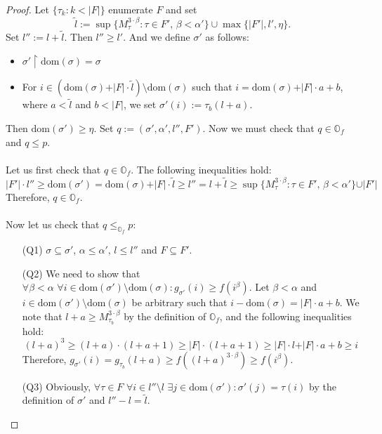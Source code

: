 \documentclass[12pt,a4paper]{scrartcl}
\theoremstyle{definition}
\numberwithin{equation}{section}
\begin{document}
\begin{proof}
Let $\{\tau_k \colon k < \vert F\vert\}$ enumerate $F$ and set $$\tilde{l}:= \sup\{M_\tau^{3 \cdot \beta} \colon \tau \in F', \, \beta < \alpha' \} \cup \max\{ \vert F' \vert, l',\eta\}.$$ Set $l'':=l + \tilde{l}$. Then $l'' \geq l'$. And we define $\sigma'$ as follows:
\begin{itemize}
\item $\sigma' \restriction \text{dom}(\sigma) =\sigma$
\item For $i \in (\text{dom}(\sigma) + \vert F \vert \cdot \tilde{l} ) \setminus \text{dom}(\sigma)$ such that $i= \text{dom}(\sigma) + \vert F \vert \cdot a + b$, where $a < \tilde{l}$ and $b < \vert F \vert$, we set $\sigma'(i):=\tau_b(l+a)$.
\end{itemize}
Then $\text{dom}(\sigma') \geq \eta$. Set $q:=(\sigma', \alpha', l'',F')$. Now we must check that $q \in \mathbb{O}_f$ and $q \leq p$.\\
\\
Let us first check that $q \in \mathbb{O}_f$. The following inequalities hold:
$$ \vert F'\vert \cdot l'' \geq \text{dom}(\sigma') = \text{dom}(\sigma) + \vert F \vert \cdot \tilde{l} \geq l''= l + \tilde{l} \geq \sup\{M_\tau^{3 \cdot \beta} \colon \tau \in F', \, \beta < \alpha'\} \cup \vert F' \vert $$ Therefore, $q \in \mathbb{O}_f$.\\
\\
Now let us check that $q \leq_{\mathbb{O}_f} p$: 
\begin{itemize}
\item [(Q1)] $\sigma \subseteq \sigma'$, $\alpha \leq \alpha'$, $l \leq l''$ and $F \subseteq F'$.
\item [(Q2)] We need to show that $\forall \beta < \alpha \,\, \forall i \in \text{dom}(\sigma') \setminus \text{dom}(\sigma) \colon g_{\sigma'}(i) \geq f(i^\beta)$. Let $\beta < \alpha$ and $i \in \text{dom}(\sigma') \setminus \text{dom}(\sigma)$ be arbitrary such that $i - \text{dom}(\sigma) =\vert F \vert \cdot a +b$. We note that $l+a \geq M_{\tau_b}^{3 \cdot \beta}$ by the definition of $\mathbb{O}_f$, and the following inequalities hold:
$$(l+a)^3 \geq (l+a) \cdot (l+a+1) \geq \vert F \vert \cdot (l+a+1) \geq \vert F \vert \cdot l + \vert F \vert \cdot a +b \geq i$$
Therefore, $g_{\sigma'} (i)= g_{\tau_b}(l+a) \geq f((l+a)^{3 \cdot \beta}) \geq f(i^\beta)$.
\item [(Q3)] Obviously, $\forall \tau \in F \,\, \forall i \in l'' \setminus l \,\, \exists j \in \text{dom}(\sigma') \colon \sigma'(j)=\tau(i)$ by the definition of $\sigma'$ and $l'' - l= \tilde{l}$.
\end{itemize}
\end{proof}
\end{document}
